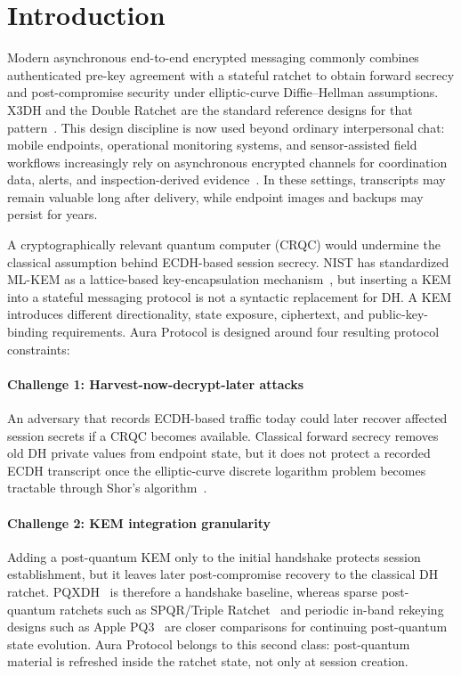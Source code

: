 \documentclass[preprint,12pt]{elsarticle}
\theoremstyle{definition}
\newcommand{\tech}[1]{\textnormal{#1}}
\newcommand{\SPQR}{\tech{SPQR}}
\newcommand{\PQThree}{\tech{PQ3}}
\begin{document}
\section{Introduction}\label{sec:intro}

Modern asynchronous end-to-end encrypted messaging commonly combines
authenticated pre-key agreement with a stateful ratchet to obtain forward secrecy
and post-compromise security under elliptic-curve Diffie--Hellman assumptions.
X3DH and the Double Ratchet are the standard reference designs for that
pattern~\cite{signal-x3dh,cohn-gordon2020}. This design discipline is now used beyond ordinary interpersonal chat: mobile
endpoints, operational monitoring systems, and sensor-assisted field workflows
increasingly rely on asynchronous encrypted channels for coordination data, alerts,
and inspection-derived evidence~\cite{svystun2025dytam,svystun2024thermal,lysyi2025fire}.
In these settings, transcripts may remain valuable long after delivery, while
endpoint images and backups may persist for years.

A cryptographically relevant quantum computer (CRQC) would undermine the
classical assumption behind ECDH-based session secrecy. NIST has standardized
ML-KEM as a lattice-based key-encapsulation mechanism~\cite{fips203}, but
inserting a KEM into a stateful messaging protocol is not a syntactic
replacement for DH. A KEM introduces different directionality, state exposure,
ciphertext, and public-key-binding requirements. Aura Protocol is designed
around four resulting protocol constraints:

\paragraph{Challenge 1: Harvest-now-decrypt-later attacks}
An adversary that records ECDH-based traffic today could later recover affected
session secrets if a CRQC becomes available. Classical forward secrecy removes
old DH private values from endpoint state, but it does not protect a recorded
ECDH transcript once the elliptic-curve discrete logarithm problem becomes
tractable through Shor's algorithm~\cite{shor1997}.

\paragraph{Challenge 2: KEM integration granularity}
Adding a post-quantum KEM only to the initial handshake protects session
establishment, but it leaves later post-compromise recovery to the classical DH
ratchet. PQXDH~\cite{signal-pqxdh} is therefore a handshake baseline, whereas
sparse post-quantum ratchets such as \SPQR{}/Triple Ratchet~\cite{signal-spqr,signal-double-ratchet,mlkem-braid}
and periodic in-band rekeying designs such as Apple \PQThree{}~\cite{apple-pq3,stebila-pq3,linker-pq3}
are closer comparisons for continuing post-quantum state evolution. Aura
Protocol belongs to this second class: post-quantum material is refreshed inside
the ratchet state, not only at session creation.
\end{document}
